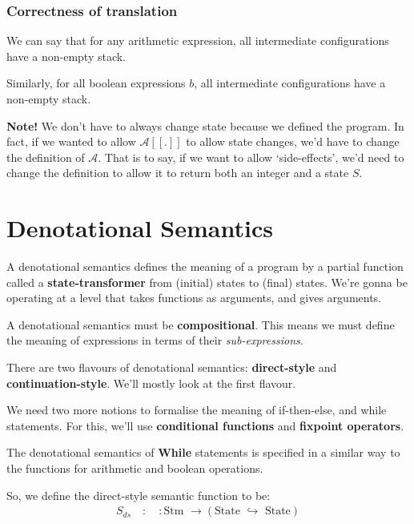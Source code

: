 \documentclass[11pt,a4paper,headsepline,titlepage,dvipsnames,cmyk]{scrartcl}
\newcommand\pfun{\hookrightarrow}
\begin{document}
\subsubsection{Correctness of translation}%
\label{ssub:correctness-translation}
We can say that for any arithmetic expression, all intermediate
configurations have a non-empty stack. 

Similarly, for all boolean expressions $b$, all intermediate
configurations have a non-empty stack.

\textbf{Note!} We don't have to always change state because we defined the
program. In fact, if we wanted to allow $\mathcal{A}[\![.]\!]$ to allow
state changes, we'd have to change the definition of $\mathcal{A}$. That
is to say, if we want to allow `side-effects', we'd need to change the
definition to allow it to return both an integer and a state $S$.

\section{Denotational Semantics}%
\label{sec:denotational-semantics}
A denotational semantics defines the meaning of a program by a partial
function called a \textbf{state-transformer} from (initial) states to
(final) states. We're gonna be operating at a level that takes functions
as arguments, and gives arguments.

A denotational semantics must be \textbf{compositional}. This means we
must define the meaning of expressions in terms of their
\textit{sub-expressions}.

There are two flavours of denotational semantics: \textbf{direct-style}
and \textbf{continuation-style}. We'll mostly look at the first flavour.

We need two more notions to formalise the meaning of if-then-else, and
while statements. For this, we'll use \textbf{conditional functions} and
\textbf{fixpoint operators}.

The denotational semantics of \textbf{While} statements is specified in a
similar way to the functions for arithmetic and boolean operations.

So, we define the direct-style semantic function to be:
\begin{align*}
    S_{ds} \quad : \quad: \text{Stm } \rightarrow ( \text{State } \pfun
    \text{ State})
\end{align*}
\end{document}
